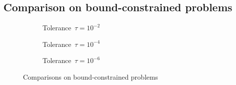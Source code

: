 
\subsection{Comparison on bound-constrained problems}

\begin{figure}[ht]
    \centering
    \begin{subfigure}[b]{0.49\textwidth}
        \centering
        \caption{Tolerance~$\tau = 10^{-2}$}
    \end{subfigure}
    \hfill
    \begin{subfigure}[b]{0.49\textwidth}
        \centering
        \caption{Tolerance~$\tau = 10^{-4}$}
    \end{subfigure}
    \begin{subfigure}[b]{0.49\textwidth}
        \centering
        \caption{Tolerance~$\tau = 10^{-6}$}
    \end{subfigure}
    \caption{Comparisons on bound-constrained problems}
\end{figure}




